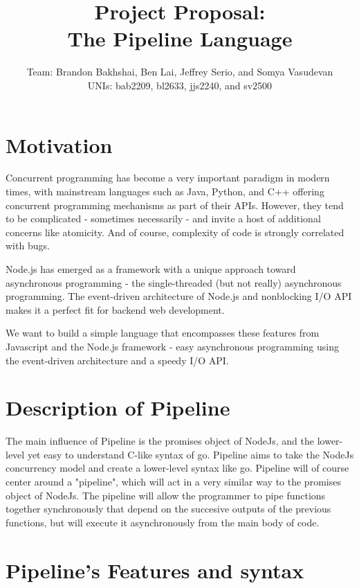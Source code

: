 \documentclass[11pt]{article}
\title{\textbf{Project Proposal:\\ The Pipeline Language}}
\author{Team: Brandon Bakhshai, Ben Lai, Jeffrey Serio, and Somya Vasudevan \\ UNIs: bab2209, bl2633, jjs2240, and sv2500}
\begin{document}
\maketitle
\thispagestyle{empty}
\renewcommand{\thesubsubsection}{\thesubsection.\alph{subsubsection}.}


\section{Motivation}
\hspace{0.5cm} Concurrent programming has become a very important paradigm in modern times, with mainstream languages such as Java, Python, and C++ offering concurrent programming mechanisms as part of their APIs. However, they tend to be complicated - sometimes necessarily - and invite a host of additional concerns like atomicity. And of course, complexity of code is strongly correlated with bugs.

Node.js has emerged as a framework with a unique approach toward asynchronous programming - the single-threaded (but not really) asynchronous programming. The event-driven architecture of Node.js and nonblocking I/O API makes it a perfect fit for backend web development.

We want to build a simple language that encompasses these features from Javascript and the Node.js framework - easy asynchronous programming using the event-driven architecture and a speedy I/O API.

\section{Description of Pipeline}
\hspace{0.5cm} The main influence of Pipeline is the promises object of NodeJs, and the lower-level yet easy to understand C-like syntax of go. Pipeline aims to take the NodeJs concurrency model and create a lower-level syntax like go. Pipeline will of course center around a "pipeline", which will act in a very similar way to the promises object of NodeJs. The pipeline will allow the programmer to pipe functions together synchronously that depend on the succesive outputs of the previous functions, but will execute it asynchronously from the main body of code.

\section{Pipeline's Features and syntax}
\end{document}
